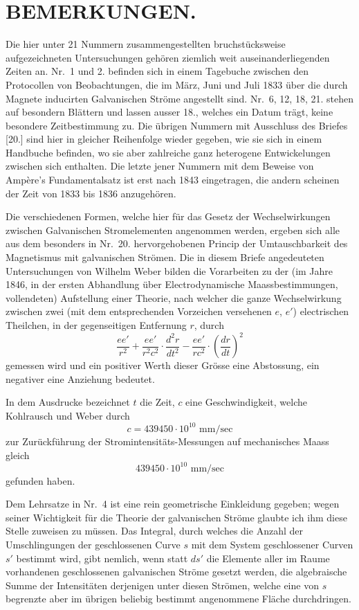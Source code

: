 \documentclass[fontsize=10pt,paper=a5,pagesize=auto]{scrbook}
\newcommand{\origpage}[1]{\marginpar{\footnotesize\textit{S. #1}}}
\begin{document}
\section*{BEMERKUNGEN.}
\label{sec:bemerkungen}

\origpage{644}
Die hier unter 21 Nummern zusammengestellten bruchstücksweise aufgezeichneten Untersuchungen gehören ziemlich weit auseinanderliegenden Zeiten an. Nr.~1 und 2. befinden sich in einem Tagebuche zwischen den Protocollen von Beobachtungen, die im März, Juni und Juli 1833 über die durch Magnete inducirten Galvanischen Ströme angestellt sind. Nr.~6, 12, 18, 21. stehen auf besondern Blättern und lassen ausser 18., welches ein Datum trägt, keine besondere Zeitbestimmung zu. Die übrigen Nummern mit Ausschluss des Briefes [20.] sind hier in gleicher Reihenfolge wieder gegeben, wie sie sich in einem Handbuche befinden, wo sie aber zahlreiche ganz heterogene Entwickelungen zwischen sich enthalten. Die letzte jener Nummern mit dem Beweise von Ampère's Fundamentalsatz ist erst nach 1843 eingetragen, die andern scheinen der Zeit von 1833 bis 1836 anzugehören.

Die verschiedenen Formen, welche hier für das Gesetz der Wechselwirkungen zwischen Galvanischen Stromelementen angenommen werden, ergeben sich alle aus dem besonders in Nr.~20. hervorgehobenen Princip der Umtauschbarkeit des Magnetismus mit galvanischen Strömen. Die in diesem Briefe angedeuteten Untersuchungen von Wilhelm Weber bilden die Vorarbeiten zu der (im Jahre 1846, in der ersten Abhandlung über Electrodynamische Maassbestimmungen, vollendeten) Aufstellung einer Theorie, nach welcher die ganze Wechselwirkung zwischen zwei (mit dem entsprechenden Vorzeichen versehenen $e$, $e'$) electrischen Theilchen, in der gegenseitigen Entfernung $r$, durch
\[
\frac{ee'}{r^2} + \frac{ee'}{r^2 c^2} \cdot \frac{d^2r}{dt^2} - \frac{ee'}{r c^2} \cdot \left(\frac{dr}{dt}\right)^2
\]
gemessen wird und ein positiver Werth dieser Grösse eine Abstossung, ein negativer eine Anziehung bedeutet.

In dem Ausdrucke bezeichnet $t$ die Zeit, $c$ eine Geschwindigkeit, welche Kohlrausch und Weber durch
\[
c = 439450 \cdot 10^{10} \text{ mm/sec}
\]
 zur Zurückführung der Stromintensitäts-Messungen auf mechanisches Maass gleich
\[
439450 \cdot 10^{10} \text{ mm/sec}
\]
gefunden haben.

\origpage{645}
Dem Lehrsatze in Nr.~4 ist eine rein geometrische Einkleidung gegeben; wegen seiner Wichtigkeit für die Theorie der galvanischen Ströme glaubte ich ihm diese Stelle zuweisen zu müssen. Das Integral, durch welches die Anzahl der Umschlingungen der geschlossenen Curve $s$ mit dem System geschlossener Curven $s'$ bestimmt wird, gibt nemlich, wenn statt $ds'$ die Elemente aller im Raume vorhandenen geschlossenen galvanischen Ströme gesetzt werden, die algebraische Summe der Intensitäten derjenigen unter diesen Strömen, welche eine von $s$ begrenzte aber im übrigen beliebig bestimmt angenommene Fläche durchdringen.
\end{document}
